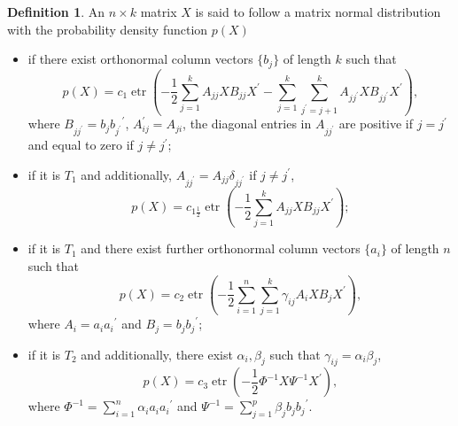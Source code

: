 \documentclass{amsart}
\theoremstyle{definition}
\newtheorem{definition}{Definition}
\numberwithin{equation}{section}
\begin{document}
\begin{definition} An $n\times k$ matrix $X$ is said to follow a matrix normal distribution with the probability density function $p(X)$
	\begin{itemize}
		\item[$T_{1}$] if there exist orthonormal column vectors $\{ b_{j}\}$ of length $k$ such that
        \begin{equation}
            p(X) = c_{1}\operatorname{etr} \left(-\frac {1}{2} \sum_{j=1}^{k} { A}_{jj}  X{ B}_{jj}{ X}^{\prime} - \sum_{j=1}^{k}\sum_{j^{\prime}=j+1}^{k}{ A}_{jj^{\prime}}  X{ B}_{jj^{\prime}}{ X}^{\prime}\right),
			\label{eq: T1}
		\end{equation}
		where $ B_{jj^{\prime}} =  b_{j} { b_{j^{\prime}}}^{\prime}$, %
        $A_{ij}^{\prime} = A_{ji}$, the diagonal entries in $ A_{jj^{\prime}}$ are positive if $j=j^{\prime}$ and equal to zero if $j\neq j^{\prime}$;
        \item[$T_{1\frac{1}{2}}$] if it is $T_{1}$ and additionally, $ A_{jj^{\prime}} =  A_{jj}\delta_{jj^{\prime}}$ if $j\neq j^{\prime}$,
		\begin{equation}	%
        p( X) = c_{1\frac{1}{2}}\operatorname{etr} \left(-\frac {1}{2} \sum_{j=1}^{k} { A}_{jj} X{ B}_{jj}{ X}^{\prime}\right);		\label{eq: T1.5}		\end{equation}

        \item[$T_{2}$] if it is $T_{1}$ and there exist further orthonormal column vectors $\{ a_{i}\}$ of length $n$ such that 
		\begin{equation}
			 p( X) =%
             c_2\operatorname{etr} \left(-\frac {1}{2} \sum_{i=1}^{n}\sum_{j=1}^{k} \gamma_{ij} { A}_{i} X{ B}_{j}{ X}^{\prime}\right),
			\label{eq: T2}
		\end{equation}
		where $ A_{i} =  a_{i}{ a_{i}}^{\prime}$ and $ B_{j} =  b_{j}{ b_{j}}^{\prime}$;

        \item[$T_3$] if it is $T_{2}$ and additionally, there exist $\alpha_{i}, \beta_{j}$ such that $\gamma_{ij} = \alpha_{i} \beta_{j}$,
			\begin{equation}
				p( X) = %
                c_3 \operatorname{etr} \left(-\frac {1}{2}  \varPhi^{-1}  X  \varPsi^{-1} {{ X}}^{\prime}\right),
				\label{eq: T3}
			\end{equation}
			where $ \varPhi^{-1} = \sum_{i=1}^{n} \alpha_{i}  a_{i} { a_{i}}^{\prime}$ and $ \varPsi^{-1} = \sum_{j=1}^{p} \beta_{j}  b_{j}{ b_{j}}^{\prime}$.     
	\end{itemize}\label{def: normal matrix}
\end{definition}
\end{document}
